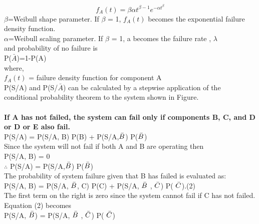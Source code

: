 \documentclass{article}
\begin{document}
\begin{itemize}
    $$f_{A}(t)=\beta \alpha t^{\beta-1} e^{-\alpha t^{\beta}}$$
    $\beta$=Weibull shape parameter. If $\beta$ = 1, $f_{A}(t)$ becomes the exponential failure density function.\\
    $\alpha$=Weibull scaling parameter. If $\beta$ = 1, a becomes
the failure rate , $\lambda$ \\
    and probability of no failure is \\ \vspace{1mm}
    \hspace{15mm}P($\bar{A}$)=1-P(A) \\
    where,\\ \vspace{1mm}
    \hspace{15mm}$f_{A}(t)$ = failure density function for component A\\
    P(S/A) and P(S/$\bar{A}$) can be calculated by  a stepwise application of the conditional probability theorem to the system shown in Figure.\\ \\
    \textbf{If A has not failed, the system can fail only if components B, C, and D or D or E also fail.}\\\vspace{5mm}
    \hspace{15mm}P(S/A) = P(S/A, B) P(B) + P(S/A,$\Bar{B}$) P($\Bar{B}$) \\
    Since the system will not fail if both A and B are operating then \\\vspace{5mm}
\hspace{15mm}P(S/A, B) = 0 \\ \vspace{5mm}
\hspace{15mm}$\therefore$  P(S/A) =  P(S/A,$\Bar{B}$) P($\Bar{B}$) \\
The probability of system failure given that B has failed is evaluated
as:\\ \vspace{5mm}
\hspace{15mm}P(S/A, B) = P(S/A, $\Bar{B}$, C) P(C) + P(S/A, $\Bar{B}$ , $\Bar{C}$) P( $\Bar{C}$).\hspace{30mm}(2) \\ 
The first term on the right is zero since the system cannot fail if C
has not failed. Equation (2) becomes \\ \vspace{5mm}
\hspace{15mm}P(S/A, $\Bar{B}$) =  P(S/A, $\Bar{B}$ , $\Bar{C}$) P( $\Bar{C}$)\\

\end{itemize}
\end{document}
